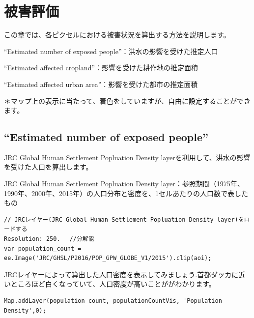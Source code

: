 \documentclass[
]{book}
\begin{document}
\hypertarget{ux88abux5bb3ux8a55ux4fa1}{%
\chapter{被害評価　　}\label{ux88abux5bb3ux8a55ux4fa1}}

この章では、各ピクセルにおける被害状況を算出する方法を説明します。

``Estimated number of exposed people''：洪水の影響を受けた推定人口

``Estimated affected cropland''：影響を受けた耕作地の推定面積　　

``Estimated affected urban area''：影響を受けた都市の推定面積

＊マップ上の表示に当たって、着色をしていますが、自由に設定することができます。

\hypertarget{estimated-number-of-exposed-people}{%
\section{``Estimated number of exposed people''}\label{estimated-number-of-exposed-people}}

JRC Global Human Settlement Popluation Density layerを利用して、洪水の影響を受けた人口を算出します。

JRC Global Human Settlement Popluation Density layer：参照期間（1975年、1990年、2000年、2015年）の人口分布と密度を、1セルあたりの人口数で表したもの　　

\begin{verbatim}
// JRCレイヤー(JRC Global Human Settlement Popluation Density layer)をロードする
Resolution: 250. 　//分解能
var population_count = ee.Image('JRC/GHSL/P2016/POP_GPW_GLOBE_V1/2015').clip(aoi);
\end{verbatim}

JRCレイヤーによって算出した人口密度を表示してみましょう.首都ダッカに近いところほど白くなっていて、人口密度が高いことががわかります。

\begin{verbatim}
Map.addLayer(population_count, populationCountVis, 'Population Density',0);
\end{verbatim}
\end{document}
